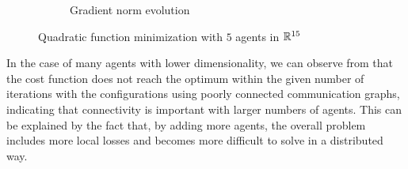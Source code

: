 \documentclass[a4paper,11pt,oneside]{book}
\begin{document}
\begin{figure}[H]
\begin{subfigure}[t]{0.48\linewidth}
            \caption{Gradient norm evolution}
      \end{subfigure}
      \caption{Quadratic function minimization with $5$ agents in ${\mathbb{R}}^{15}$}
      \label{fig:quadratic_5_15}
\end{figure}

In the case of many agents with lower dimensionality, we can observe from  that the cost function does not reach the optimum within the given number of iterations with the configurations using poorly connected communication graphs, indicating that connectivity is important with larger numbers of agents. This can be explained by the fact that, by adding more agents, the overall problem includes more local losses and becomes more difficult to solve in a distributed way.
\end{document}
